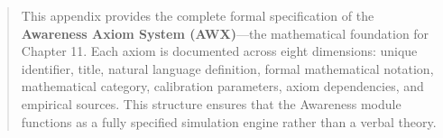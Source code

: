 \begin{abstract}
This appendix provides the complete formal specification of the \textbf{Awareness Axiom System (AWX)}---the mathematical foundation for Chapter 11. Each axiom is documented across eight dimensions: unique identifier, title, natural language definition, formal mathematical notation, mathematical category, calibration parameters, axiom dependencies, and empirical sources. This structure ensures that the Awareness module functions as a fully specified simulation engine rather than a verbal theory.
\end{abstract}


